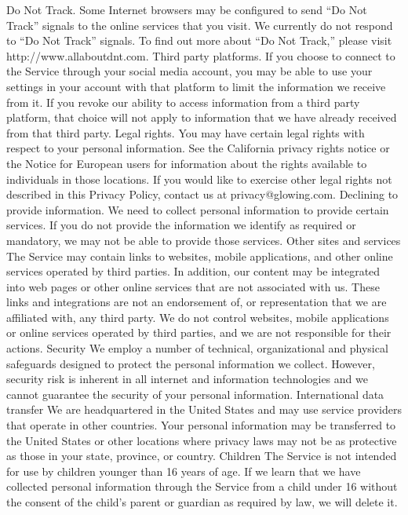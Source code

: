 Do Not Track. Some Internet browsers may be configured to send “Do
Not Track” signals to the online services that you visit. We currently do
not respond to “Do Not Track” signals. To find out more about “Do Not
Track,” please visit http://www.allaboutdnt.com.
Third party platforms. If you choose to connect to the Service through
your social media account, you may be able to use your settings in your
account with that platform to limit the information we receive from it. If
you revoke our ability to access information from a third party platform,
that choice will not apply to information that we have already received
from that third party.
Legal rights. You may have certain legal rights with respect to your
personal information. See the California privacy rights notice or the
Notice for European users for information about the rights available to
individuals in those locations. If you would like to exercise other legal
rights not described in this Privacy Policy, contact us
at privacy@glowing.com.
Declining to provide information. We need to collect personal
information to provide certain services. If you do not provide the
information we identify as required or mandatory, we may not be able to
provide those services.
Other sites and services
The Service may contain links to websites, mobile applications, and
other online services operated by third parties. In addition, our content
may be integrated into web pages or other online services that are not
associated with us. These links and integrations are not an endorsement
of, or representation that we are affiliated with, any third party. We do
not control websites, mobile applications or online services operated by
third parties, and we are not responsible for their actions.
Security
We employ a number of technical, organizational and physical
safeguards designed to protect the personal information we collect.
However, security risk is inherent in all internet and information
technologies and we cannot guarantee the security of your personal
information.
International data transfer
We are headquartered in the United States and may use service
providers that operate in other countries. Your personal information may
be transferred to the United States or other locations where privacy laws
may not be as protective as those in your state, province, or country.
Children
The Service is not intended for use by children younger than 16 years of
age. If we learn that we have collected personal information through the
Service from a child under 16 without the consent of the child’s parent or
guardian as required by law, we will delete it.
